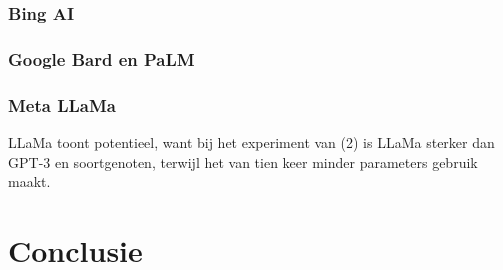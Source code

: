 \subsubsection{Bing AI}



\subsubsection{Google Bard en PaLM}



\subsubsection{Meta LLaMa}



LLaMa toont potentieel, want bij het experiment van (2) is LLaMa sterker dan GPT-3 en soortgenoten, terwijl het van tien keer minder parameters gebruik maakt.


\section{Conclusie}






